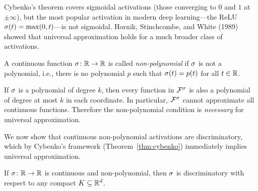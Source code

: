 \documentclass[11pt,a4paper]{article}
\begin{document}
Cybenko's theorem covers sigmoidal activations (those converging to $0$
and $1$ at $\pm\infty$), but the most popular activation in modern deep
learning---the ReLU $\sigma(t) = \max(0,t)$---is not sigmoidal.
Hornik, Stinchcombe, and White (1989) showed that universal approximation
holds for a much broader class of activations.

\begin{definition}
\label{def:non-polynomial}
A continuous function $\sigma \colon \mathbb{R} \to \mathbb{R}$ is called
\emph{non-polynomial} if $\sigma$ is not a polynomial, i.e., there is no
polynomial $p$ such that $\sigma(t) = p(t)$ for all $t \in \mathbb{R}$.
\end{definition}

\begin{remark}
\label{rem:polynomial-fail}
If $\sigma$ is a polynomial of degree $k$, then every function in
$\mathcal{F}^{\sigma}$ is also a polynomial of degree at most $k$ in each
coordinate.  In particular, $\mathcal{F}^{\sigma}$ cannot approximate all
continuous functions.  Therefore the non-polynomial condition is
\emph{necessary} for universal approximation.
\end{remark}

We now show that continuous non-polynomial activations are discriminatory,
which by Cybenko's framework (Theorem~\ref{thm:cybenko}) immediately
implies universal approximation.

\begin{lemma}
\label{lem:non-poly-disc}
If $\sigma \colon \mathbb{R} \to \mathbb{R}$ is continuous and non-polynomial, then
$\sigma$ is discriminatory with respect to any compact $K \subseteq \mathbb{R}^d$.
\end{lemma}
\end{document}
